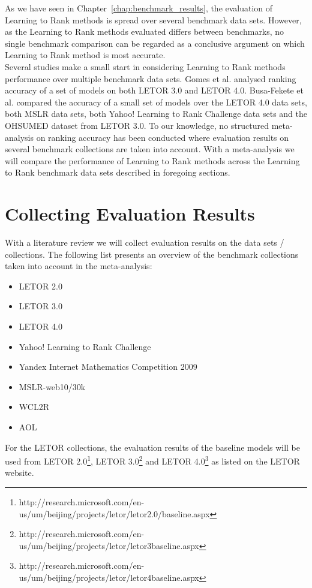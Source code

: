 \label{chap:cross_comparison}
As we have seen in Chapter~\ref{chap:benchmark_results}, the evaluation of Learning to Rank methods is spread over several benchmark data sets. However, as the Learning to Rank methods evaluated differs between benchmarks, no single benchmark comparison can be regarded as a conclusive argument on which Learning to Rank method is most accurate.\\

Several studies make a small start in considering Learning to Rank methods performance over multiple benchmark data sets. Gomes et al. \cite{Gomes2013} analysed ranking accuracy of a set of models on both LETOR 3.0 and LETOR 4.0. Busa-Fekete et al. \cite{Busa-Fekete2013} compared the accuracy of a small set of models over the LETOR 4.0 data sets, both MSLR data sets, both Yahoo! Learning to Rank Challenge data sets and the OHSUMED dataset from LETOR 3.0. To our knowledge, no structured meta-analysis on ranking accuracy has been conducted where evaluation results on several benchmark collections are taken into account. With a meta-analysis we will compare the performance of Learning to Rank methods across the Learning to Rank benchmark data sets described in foregoing sections.

\section{Collecting Evaluation Results}
\label{sec:collecting_evaluation_results}
With a literature review we will collect evaluation results on the data sets / collections. The following list presents an overview of the benchmark collections taken into account in the meta-analysis:
\begin{itemize}
\item LETOR 2.0
\item LETOR 3.0
\item LETOR 4.0
\item Yahoo! Learning to Rank Challenge
\item Yandex Internet Mathematics Competition 2009
\item MSLR-web10/30k
\item WCL2R
\item AOL
\end{itemize}

For the LETOR collections, the evaluation results of the baseline models will be used from LETOR 2.0\footnote{http://research.microsoft.com/en-us/um/beijing/projects/letor/letor2.0/baseline.aspx}, LETOR 3.0\footnote{http://research.microsoft.com/en-us/um/beijing/projects/letor/letor3baseline.aspx} and LETOR 4.0\footnote{http://research.microsoft.com/en-us/um/beijing/projects/letor/letor4baseline.aspx} as listed on the LETOR website.\\

